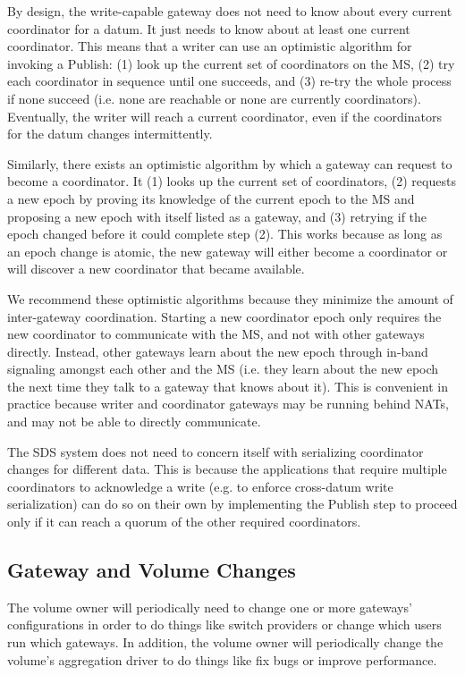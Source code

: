By design, the write-capable gateway does not need to know
about every current coordinator for a datum.  It just needs to know about
at least one current coordinator.  This means that a writer can use an
optimistic algorithm for invoking a Publish: 
(1) look up the current set of coordinators on the MS, (2) try each coordinator in
sequence until one succeeds, and (3) re-try the whole process if none
succeed (i.e. none are reachable or none are currently coordinators).
Eventually, the writer will reach a current coordinator, even if the
coordinators for the datum changes intermittently.

Similarly, there exists an optimistic algorithm by which a gateway can request
to become a coordinator.  It (1) looks up the current set of coordinators, (2)
requests a new epoch by proving its knowledge of the current epoch to the MS
and proposing a new epoch with itself listed as a gateway, and (3) retrying if the epoch
changed before it could complete step (2).  This works because as long as an epoch change
is atomic, the new gateway will either become a coordinator or will discover a
new coordinator that became available.

We recommend these optimistic algorithms because they minimize the
amount of inter-gateway coordination.  Starting a new coordinator
epoch only requires the new coordinator to communicate with the MS, and not with
other gateways directly.  Instead,
other gateways learn about the new epoch through in-band signaling amongst each
other and the MS (i.e. they learn about the new epoch the next time they talk to
a gateway that knows about it).  This is convenient in practice because writer
and coordinator gateways may be running behind NATs, and may not be able to
directly communicate.

The SDS system does not need to concern itself with serializing coordinator
changes for different data.  This is because the applications that require
multiple coordinators to acknowledge a write (e.g. to enforce cross-datum write
serialization) can do so on their own by implementing the
Publish step to proceed only if it can reach a quorum of the other required
coordinators.

\subsection{Gateway and Volume Changes}

The volume owner will periodically need to change one or more gateways'
configurations in order to do things like switch providers or change
which users run which gateways.  In addition, the volume owner will periodically
change the volume's aggregation driver to do things like fix bugs or improve
performance.

